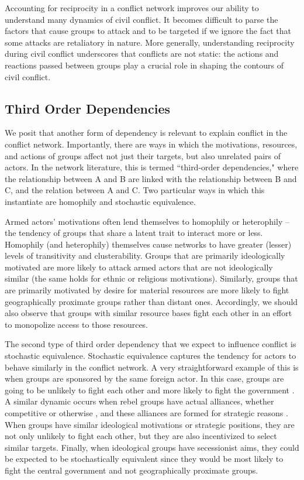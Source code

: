 Accounting for reciprocity in a conflict network improves our ability to understand many dynamics of civil conflict. It becomes difficult to parse the factors that cause groups to attack and to be targeted if we ignore the fact that some attacks are retaliatory in nature. More generally, understanding reciprocity during civil conflict underscores that conflicts are not static: the actions and reactions passed between groups play a crucial role in shaping the contours of civil conflict.

\subsection*{Third Order Dependencies}

We posit that another form of dependency is relevant to explain conflict in the conflict network. Importantly, there are ways in which the motivations, resources, and actions of groups affect not just their targets, but also unrelated pairs of actors. In the network literature, this is termed ``third-order dependencies," where the relationship between A and B are linked with the relationship between B and C, and the relation between A and C. Two particular ways in which this instantiate are homophily and stochastic equivalence.

Armed actors' motivations often lend themselves to homophily or heterophily -- the tendency of groups that share a latent trait to interact more or less. Homophily (and heterophily) themselves cause networks to have greater (lesser) levels of transitivity and clusterability. Groups that are primarily ideologically motivated are more likely to attack armed actors that are not ideologically similar (the same holds for ethnic or religious motivations). Similarly, groups that are primarily motivated by desire for material resources are more likely to fight geographically proximate groups rather than distant ones. Accordingly, we should also observe that groups with similar resource bases fight each other in an effort to monopolize access to those resources.

The second type of third order dependency that we expect to influence conflict is stochastic equivalence. Stochastic equivalence captures the tendency for actors to behave similarly in the conflict network. A very straightforward example of this is when groups are sponsored by the same foreign actor. In this case, groups are going to be unlikely to fight each other and more likely to fight the government \citep{bapat:bond:2012}. A similar dynamic occurs when rebel groups have actual alliances, whether competitive or otherwise \citep{zeigler:2015}, and these alliances are formed for strategic reasons \citet{fotini:2012}. When groups have similar ideological motivations or strategic positions, they are not only unlikely to fight each other, but they are also incentivized to select similar targets. Finally, when ideological groups have secessionist aims, they could be expected to be stochastically equivalent since they would be most likely to fight the central government and not geographically proximate groups.

